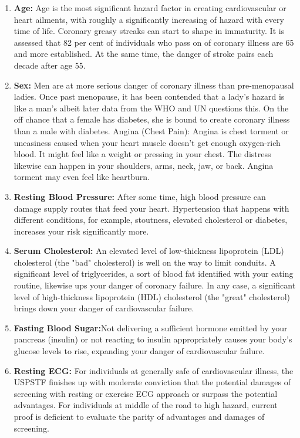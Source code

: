 \documentclass[oneside,12pt]{Classes/VTU}
\begin{document}
	\begin{enumerate}
		\item \textbf{Age:} Age is the most significant hazard factor in creating cardiovascular or heart ailments, with roughly a significantly increasing of hazard with every time of life. Coronary greasy streaks can start to shape in immaturity. It is assessed that 82 per cent of individuals who pass on of coronary illness are 65 and more established. At the same time, the danger of stroke pairs each decade after age 55.
		
		\item \textbf{Sex:} Men are at more serious danger of coronary illness than pre-menopausal ladies. Once past menopause, it has been contended that a lady's hazard is like a man's albeit later data from the WHO and UN questions this. On the off chance that a female has diabetes, she is bound to create coronary illness than a male with diabetes. 
		Angina (Chest Pain): Angina is chest torment or uneasiness caused when your heart muscle doesn't get enough oxygen-rich blood. It might feel like a weight or pressing in your chest. The distress likewise can happen in your shoulders, arms, neck, jaw, or back. Angina torment may even feel like heartburn.
	
		\item \textbf{Resting Blood Pressure:} After some time, high blood pressure can damage supply routes that feed your heart. Hypertension that happens with different conditions, for example, stoutness, elevated cholesterol or diabetes, increases your risk significantly more.
		
		\item \textbf{Serum Cholesterol:} An elevated level of low-thickness lipoprotein (LDL) cholesterol (the "bad" cholesterol) is well on the way to limit conduits. A significant level of triglycerides, a sort of blood fat identified with your eating routine, likewise ups your danger of coronary failure. In any case, a significant level of high-thickness lipoprotein (HDL) cholesterol (the "great" cholesterol) brings down your danger of cardiovascular failure.
		
		\item \textbf{Fasting Blood Sugar:}Not delivering a sufficient hormone emitted by your pancreas (insulin) or not reacting to insulin appropriately causes your body's glucose levels to rise, expanding your danger of cardiovascular failure.
		
		\item \textbf{Resting ECG:} For individuals at generally safe of cardiovascular illness, the USPSTF finishes up with moderate conviction that the potential damages of screening with resting or exercise ECG approach or surpass the potential advantages. For individuals at middle of the road to high hazard, current proof is deficient to evaluate the parity of advantages and damages of screening.
		

\end{enumerate}
\end{document}
